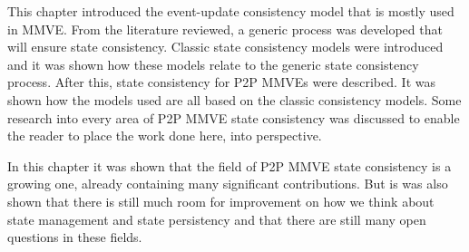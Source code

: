 This chapter introduced the event-update consistency model that is mostly used in MMVE. From the literature reviewed, a generic process was developed that will ensure state consistency. Classic state consistency models were introduced and it was shown how these models relate to the generic state consistency process. After this, state consistency for P2P MMVEs were described. It was shown how the models used are all based on the classic consistency models. Some research into every area of P2P MMVE state consistency was discussed to enable the reader to place the work done here, into perspective.

In this chapter it was shown that the field of P2P MMVE state consistency is a growing one, already containing many significant contributions. But is was also shown that there is still much room for improvement on how we think about state management and state persistency and that there are still many open questions in these fields.
